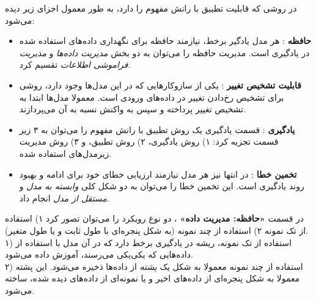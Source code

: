 در روشی که قابلیت تطبیق با رانش مفهوم را دارد، به طور معمول اجزای زیر دیده می‌شود:
\begin{itemize}
\item \textbf{
حافظه
}:
هر مدل یادگیر برخط، نیازمند حافظه برای نگهداری داده‌های استفاده شده در یادگیری است. مدیریت حافظه را می‌توان به دو بخش 
\textit{
مدیریت داده‌ها
} 
و 
\textit{
مدیریت فراموشی اطلاعات
} 
تقسیم کرد.

\item \textbf{
قابلیت تشخیص تغییر
}: 
یکی از سازوکارهایی که در این مدل‌ها وجود دارد، روشی برای تشخیص رخ‌دادن تغییر در داده‌های ورودی است. معمولا مدل‌ها ابتدا به تشخیص تغییر پرداخته و سپس به واکنش نسبه به آن می‌پردازند.


\item \textbf{
یادگیری
}: 
قسمت یادگیری یک روش تطبیق با رانش مفهوم را می‌توان به ۳ زیر قسمت تجزیه کرد: ۱) روش یادگیری، ۲) روش تطبیق، و ۳) روش مدیریت زیرمدل‌های استفاده شده.



\item \textbf{
تخمین خطا
}:
در انتها نیز هر مدل نیازمند ارزیابی خطای خود برای ادامه و بهبود روند یادگیری است. این تخمین خطا را می‌توان به دو شکل کلی 
\textit{
وابسته به مدل
} 
و 
\textit{
مستقل از مدل
} 
انجام داد.

\end{itemize}




در قسمت 
\textbf{
«حافظه: مدیریت داده»
}، 
دو نوع رویکرد را می‌توان تصور کرد ۱) استفاده از تک نمونه ۲) استفاده از چند نمونه (به شکل پنجره‌ای با طول ثابت و یا طول متغیر).\\
۱) استفاده از تک نمونه، ریشه در یادگیری برخط دارد که در آن مدل با استفاده از داده‌هایی که یکی‌یکی می‌رسند، آموزش داده می‌شود.\\
۲) استفاده از چند نمونه معمولا به شکل یک 
\textit{
پشته
} 
از داده‌ها ذخیره می‌شود. این پشته معمولا به شکل پنجره‌ای از داده‌های اخیر و یا نمونه‌ای از داده‌های دیده شده، ساخته می‌شود.


